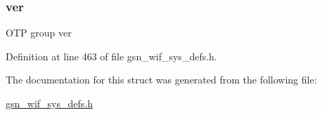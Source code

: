 \hypertarget{a00358_a2ac44d771c9e31ef7508150a7082e8cf}{
\subsubsection[{ver}]{ {\bf ver}}}
\label{a00358_a2ac44d771c9e31ef7508150a7082e8cf}
OTP group ver 

Definition at line 463 of file gsn\_\-wif\_\-sys\_\-defs.h.



The documentation for this struct was generated from the following file:\begin{DoxyCompactItemize}
\item 
\hyperlink{a00612}{gsn\_\-wif\_\-sys\_\-defs.h}\end{DoxyCompactItemize}
